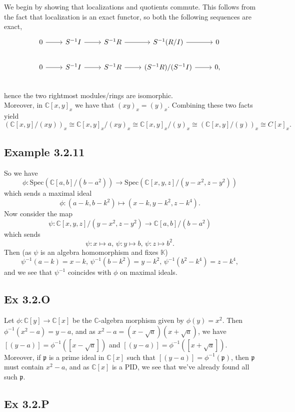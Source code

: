 \documentclass{article}
\theoremstyle{definition}
\newcommand{\C}{\mathbb{C}}
\newcommand{\K}{\mathbb{K}}
\newcommand{\Spec}{\text{Spec}}
\begin{document}
We begin by showing that localizations and quotients commute. This 
follows from the fact that localization is an exact functor, so both the following
sequences are exact, 
\[
	\begin{tikzcd}
		0 
		\arrow{r} & 
		S^{-1}I
		\arrow{r} & 
		S^{-1}R
		\arrow{r} & 
		S^{-1}(R/I)
		\arrow{r} & 
		0 \\
		0 
		\arrow{r} & 
		S^{-1}I
		\arrow{r} & 
		S^{-1}R
		\arrow{r} & 
		(S^{-1}R)/(S^{-1}I)
		\arrow{r} & 
		0, \\
	\end{tikzcd}
\] 
hence the two rightmost modules/rings are isomorphic. \\

Moreover, in $\C[x, y]_x$ we have that $(xy)_x = (y)_x$. Combining these two
facts yield
\[
	(\C[x, y] / (xy))_x
	\cong 
	\C[x, y]_x / (xy)_x
	\cong 
	\C[x, y]_x / (y)_x
	\cong 
	(\C[x, y] / (y))_x
	\cong 
	C[x]_x.
\]

\subsection*{Example 3.2.11}
So we have
\[
	\phi : \Spec(\C[a, b]/(b-a^2)) \to \Spec(\C[x,y,z]/(y-x^2, z-y^2))
\]
which sends a maximal ideal
\[
	\phi 
	: 
	(a - k, b - k^2) 
	\mapsto
	(x - k, y - k^2, z - k^4).
\]
Now consider the map 
\[
	\psi : 
	\C[x,y,z]/(y-x^2, z-y^2)
	\to 
	\C[a, b]/(b-a^2)
\]
which sends
\[
	\psi : x \mapsto a, \, 
	\psi : y \mapsto b, \,
	\psi : z \mapsto b^2.
\]
Then (as $\psi$ is an algebra homomorphism and fixes $\K$)
\[
	\psi^{-1}(a - k) = x - k, \,
	\psi^{-1}(b - k^2) = y - k^2, \,
	\psi^{-1}(b^2 - k^4) = z - k^4,
\]
and we see that $\psi^{-1}$ coincides with $\phi$ on maximal ideals.

\subsection*{Ex 3.2.O}

Let $\phi : \C[y] \to \C[x]$ be the $\C$-algebra morphism given by $\phi(y) =
x^2$. Then $\phi^{-1}(x^2 - a) = y - a$, and as $x^2 - a = (x - \sqrt{a})(x +
\sqrt{a})$, we have $[(y - a)] = \phi^{-1}([x - \sqrt{a}])$ and $[(y - a)] =
\phi^{-1}([x + \sqrt{a}])$. Moreover, if $\mathfrak{p}$ is a prime ideal in
$\C[x]$ such that $[(y - a)] = \phi^{-1}(\mathfrak{p})$, then $\mathfrak{p}$
must contain $x^2 - a$, and as $\C[x]$ is a PID, we see that we've already
found all such $\mathfrak{p}$.

\subsection*{Ex 3.2.P}
\end{document}

